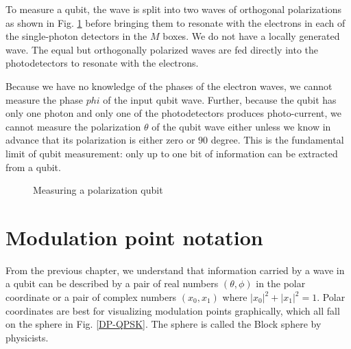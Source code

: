 \documentclass[oneside, letter, 12pt]{book}
\begin{document}
To measure a qubit, the wave is split into two waves of orthogonal polarizations as shown in Fig. \ref{Demodulator-QP} before bringing them to resonate with the electrons in each of the single-photon detectors in the $M$ boxes. We do not have a locally generated wave. The equal but orthogonally polarized waves are fed directly into the photodetectors to resonate with the electrons.

Because we have no knowledge of the phases of the electron waves, we cannot measure the phase $phi$ of the input qubit wave. Further, because the qubit has only one photon and only one of the photodetectors produces photo-current, we cannot measure the polarization $\theta$ of the qubit wave either unless we know in advance that its polarization is either zero or $90$ degree. This is the fundamental limit of qubit measurement: only up to one bit of information can be extracted from a qubit.

\begin{figure}\label{Demodulator-QP}
    \caption{Measuring a polarization qubit}
\end{figure}

\section{Modulation point notation}
From the previous chapter, we understand that information carried by a wave in a qubit can be described by a pair of real numbers $(\theta, \phi)$ in the polar coordinate or a pair of complex numbers $(x_0, x_1)$ where $|x_0|^2 + |x_1|^2 = 1$. Polar coordinates are best for visualizing modulation points graphically, which all fall on the sphere in Fig. \ref{DP-QPSK}. The sphere is called the Block sphere by physicists.
\end{document}
